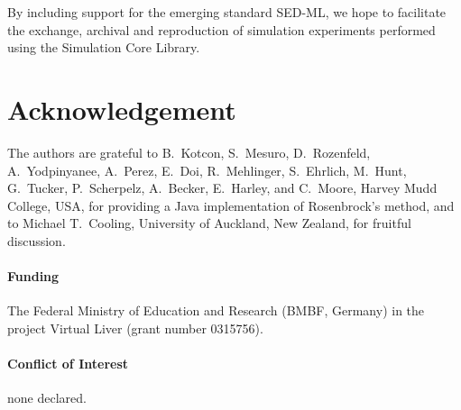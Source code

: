 \documentclass{bioinfo}
\begin{document}

By including support for the emerging standard SED-ML, we hope to facilitate the
exchange, archival and reproduction of simulation experiments performed using
the Simulation Core Library.

\section*{Acknowledgement}

The authors are grateful to B.~Kotcon, S.~Mesuro, D.~Rozenfeld, A.~Yodpinyanee,
A.~Perez, E.~Doi, R.~Mehlinger, S.~Ehrlich, M.~Hunt, G.~Tucker, P.~Scherpelz,
A.~Becker, E.~Harley, and C.~Moore, Harvey Mudd College, USA, for providing a
Java implementation of Rosenbrock's method, and to Michael T.~Cooling,
University of Auckland, New Zealand, for fruitful discussion.

\paragraph{Funding\textcolon} 
The Federal Ministry of Education and Research (BMBF, Germany) in the project
Virtual Liver (grant number 0315756).

\paragraph{Conflict of Interest\textcolon} none declared.
\vspace{-.05cm}
\end{document}
